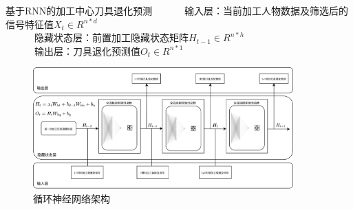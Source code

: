 \begin{frame}{基于RNN的加工中心刀具退化预测}
\ \ \ \ \ \ 输入层：当前加工人物数据及筛选后的信号特征值$X_{t} \in R^{n*d}$ \\
\ \ \ \ \ \ 隐藏状态层：前置加工隐藏状态矩阵$H_{t-1} \in R^{n*h} $ \\
\ \ \ \ \ \ 输出层：刀具退化预测值$O_t \in R^{n*1}$
\begin{figure}[htp]
    \centering
    \includegraphics[width=10cm]{刀具磨损量预测神经网络/RNN architecture.png}
    \caption{循环神经网络架构}
\end{figure}
\end{frame}
% 
% 
% 
% 
% 
% 
% 
% 